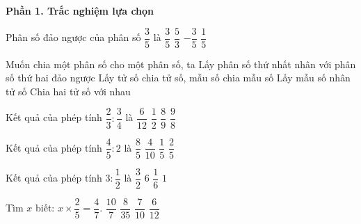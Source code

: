 \textbf{Phần 1. Trắc nghiệm lựa chọn}

\begin{ex} %
Phân số đảo ngược của phân số $\dfrac{3}{5}$ là
\choice
{$\dfrac{3}{5}$}
{\True $\dfrac{5}{3}$}
{$-\dfrac{3}{5}$}
{$\dfrac{1}{5}$}
\end{ex}

\begin{ex} %
Muốn chia một phân số cho một phân số, ta
\choice
{\True Lấy phân số thứ nhất nhân với phân số thứ hai đảo ngược}
{Lấy tử số chia tử số, mẫu số chia mẫu số}
{Lấy mẫu số nhân tử số}
{Chia hai tử số với nhau}
\end{ex}

\begin{ex} %
Kết quả của phép tính $\dfrac{2}{3} : \dfrac{3}{4}$ là
\choice
{$\dfrac{6}{12}$}
{$\dfrac{1}{2}$}
{\True $\dfrac{8}{9}$}
{$\dfrac{9}{8}$}
\end{ex}

\begin{ex} %
Kết quả của phép tính $\dfrac{4}{5} : 2$ là
\choice
{$\dfrac{8}{5}$}
{$\dfrac{4}{10}$}
{$\dfrac{1}{5}$}
{\True $\dfrac{2}{5}$}
\end{ex}

\begin{ex} %
Kết quả của phép tính $3 : \dfrac{1}{2}$ là
\choice
{$\dfrac{3}{2}$}
{\True $6$}
{$\dfrac{1}{6}$}
{$1$}
\end{ex}

\begin{ex} %
Tìm $x$ biết: $x \times \dfrac{2}{5} = \dfrac{4}{7}$.
\choice
{\True $\dfrac{10}{7}$}
{$\dfrac{8}{35}$}
{$\dfrac{7}{10}$}
{$\dfrac{6}{12}$}
\end{ex}


